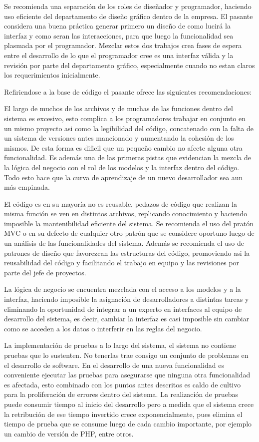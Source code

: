 Se recomienda una separación de los roles de diseñador y programador, haciendo uso eficiente del departamento de diseño gráfico dentro de la empresa. El pasante considera una buena práctica generar primero un diseño de como lucirá la interfaz y como seran las interacciones, para que luego la funcionalidad sea plasmada por el programador. Mezclar estos dos trabajos crea fases de espera entre el desarrollo de lo que el programador cree es una interfaz válida y la revisión por parte del departamento gráfico, especialmente cuando no estan claros los requerimientos inicialmente.

Refiriendose a la base de código el pasante ofrece las siguientes recomendaciones:

El largo de muchos de los archivos y de muchas de las funciones dentro del sistema es excesivo, esto complica a los programadores trabajar en conjunto en un mismo proyecto asi como la legibilidad del código, concatenado con la falta de un sistema de versiones antes mancionado y aumentando la cohesión de los mismos. De esta forma es dificil que un pequeño cambio no afecte alguna otra funcionalidad. Es además una de las primeras pistas que evidencian la mezcla de la lógica del negocio con el rol de los modelos y la interfaz dentro del código. Todo esto hace que la curva de aprendizaje de un nuevo desarrollador sea aun más empinada.

El código es en su mayoría no es reusable, pedazos de código que realizan la misma función se ven en distintos archivos, replicando conocimiento y haciendo imposible la mantenibilidad eficiente del sistema. Se recomienda el uso del pratón MVC o en su defecto de cualquier otro patrón que se considere oportuno luego de un análisis de las funcionalidades del sistema. Además se recomienda el uso de patrones de diseño que favorezcan las estructuras del código, promoviendo asi la reusabilidad del código y facilitando el trabajo en equipo y las revisiones por parte del jefe de proyectos.

La lógica de negocio se encuentra mezclada con el acceso a los modelos y a la interfaz, haciendo imposible la asignación de desarrolladores a distintas tareas y eliminando la oportunidad de integrar a un experto en interfaces al equipo de desarrollo del sistema, es decir, cambiar la interfaz es casi imposible sin cambiar como se acceden a los datos o interferir en las reglas del negocio.

La implementación de pruebas a lo largo del sistema, el sistema no contiene pruebas que lo sustenten. No tenerlas trae consigo un conjunto de problemas en el desarrollo de software. En el desarrollo de una nueva funcionalidad es conveniente ejecutar las pruebas para asegurarse que ninguna otra funcionalidad es afectada, esto combinado con los puntos antes descritos es caldo de cultivo para la proliferación de errores dentro del sistema. La realización de pruebas puede consumir tiempo al inicio del desarrollo pero a medida que el sistema crece la retribución de ese tiempo invertido crece exponencialmente, pues elimina el tiempo de prueba que se consume luego de cada cambio importante, por ejemplo un cambio de versión de PHP, entre otros.

